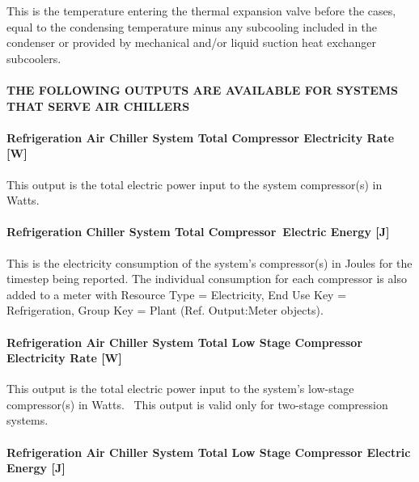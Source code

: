 This is the temperature entering the thermal expansion valve before the cases, equal to the condensing temperature minus any subcooling included in the condenser or provided by mechanical and/or liquid suction heat exchanger subcoolers.

\paragraph{THE FOLLOWING OUTPUTS ARE AVAILABLE FOR SYSTEMS THAT SERVE AIR CHILLERS}\label{the-following-outputs-are-available-for-systems-that-serve-air-chillers}

\paragraph{Refrigeration Air Chiller System Total Compressor Electricity Rate {[}W{]}}\label{refrigeration-air-chiller-system-total-compressor-electric-power-w}

This output is the total electric power input to the system compressor(s) in Watts.

\paragraph{Refrigeration Chiller System Total Compressor~Electric Energy {[}J{]}}\label{refrigeration-chiller-system-total-compressorelectric-energy-j}

This is the electricity consumption of the system's compressor(s) in Joules for the timestep being reported. The individual consumption for each compressor is also added to a meter with Resource Type = Electricity, End Use Key = Refrigeration, Group Key = Plant (Ref. Output:Meter objects).

\paragraph{Refrigeration Air Chiller System Total Low Stage Compressor Electricity Rate {[}W{]}}\label{refrigeration-air-chiller-system-total-low-stage-compressor-electric-power-w}

This output is the total electric power input to the system's low-stage compressor(s) in Watts.~ This output is valid only for two-stage compression systems.

\paragraph{Refrigeration Air Chiller System Total Low Stage Compressor Electric Energy {[}J{]}}\label{refrigeration-air-chiller-system-total-low-stage-compressor-electric-energy-j}

